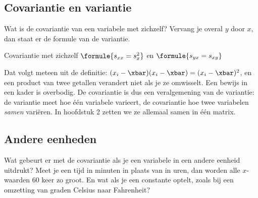 
\begin{oefeningen}
\end{oefeningen}

\subsection{Covariantie en variantie}

Wat is de covariantie van een variabele met zichzelf? Vervang je overal $y$ door $x$, dan staat er de formule van de variantie.

\begin{theorie}
\begin{stelling}{Covariantie met zichzelf}
\qquad $\formule{s_{xx} = s_x^2}$ \qquad en \qquad $\formule{s_{yx} = s_{xy}}$
\end{stelling}
\end{theorie}

Dat volgt meteen uit de definitie: $(x_i - \xbar)(x_i - \xbar) = (x_i - \xbar)^2$, en een product van twee getallen verandert niet als je ze omwisselt. Een bewijs in een kader is overbodig. De covariantie is dus een veralgemening van de variantie: de variantie meet hoe één variabele varieert, de covariantie hoe twee variabelen \textit{samen} variëren. In hoofdstuk 2 zetten we ze allemaal samen in één matrix.

\subsection{Andere eenheden}

Wat gebeurt er met de covariantie als je een variabele in een andere eenheid uitdrukt? Meet je een tijd in minuten in plaats van in uren, dan worden alle $x$-waarden 60 keer zo groot. En wat als je een constante optelt, zoals bij een omzetting van graden Celsius naar Fahrenheit?

